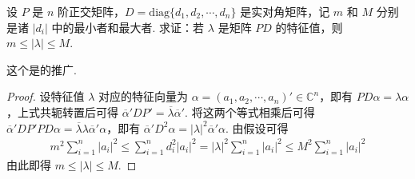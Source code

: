 \documentclass[../../main.tex]{subfiles}%
\begin{document}
\begin{proposition}\label{proposition:例9.47}
设 \(P\) 是 \(n\) 阶正交矩阵，\(D = \mathrm{diag}\{d_1,d_2,\cdots,d_n\}\) 是实对角矩阵，记 \(m\) 和 \(M\) 分别是诸 \(|d_i|\) 中的最小者和最大者. 求证：若 \(\lambda\) 是矩阵 \(PD\) 的特征值，则 \(m \leqslant  |\lambda| \leqslant  M\).
\end{proposition}
\begin{remark}
这个是的推广.
\end{remark}
\begin{proof}

设特征值 \(\lambda\) 对应的特征向量为 \(\alpha = (a_1,a_2,\cdots,a_n)' \in \mathbb{C}^n\)，即有 \(PD\alpha = \lambda\alpha\)，上式共轭转置后可得 \(\overline{\alpha}'D P' = \overline{\lambda}\overline{\alpha}'\). 将这两个等式相乘后可得 \(\overline{\alpha}'DP'PD\alpha = \overline{\lambda}\lambda\overline{\alpha}'\alpha\)，即有 \(\overline{\alpha}'D^2\alpha = |\lambda|^2\overline{\alpha}'\alpha\). 由假设可得
\begin{align*}
m^2\sum_{i = 1}^{n}|a_i|^2 \leqslant  \sum_{i = 1}^{n}d_i^2|a_i|^2 = |\lambda|^2\sum_{i = 1}^{n}|a_i|^2 \leqslant  M^2\sum_{i = 1}^{n}|a_i|^2
\end{align*}
由此即得 \(m \leqslant  |\lambda| \leqslant  M\). 

\end{proof}
\end{document}
